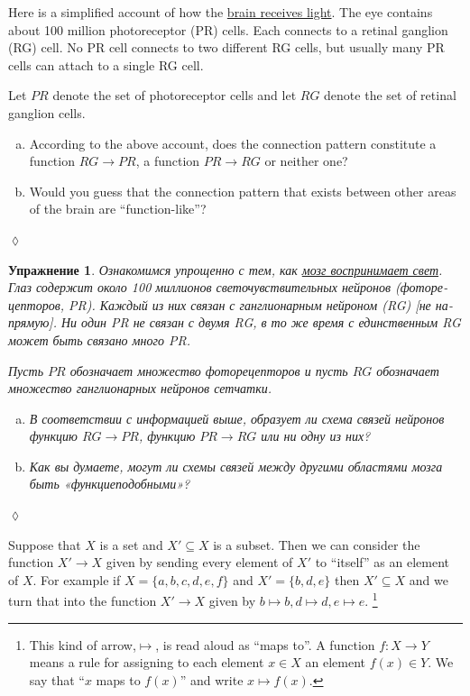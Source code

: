 \documentclass[a4paper]{book}
\def\to{\rightarrow}
\def\taking{\colon}
\def\ss{\subseteq}
\theoremstyle{myth}
\newtheorem{exampleENG}[envENG]{\begin{english}Example\end{english}}
\newtheorem{excENG}[envENG]{\begin{english}Exercise\end{english}}
\newenvironment{exerciseENG}{\begin{excENG}}{\hspace*{\fill}$\lozenge$\end{excENG}}
\newtheorem{excRUS}[envRUS]{Упражнение}
\newenvironment{exerciseRUS}{\begin{excRUS}}{\hspace*{\fill}$\lozenge$\end{excRUS}}
\def\sexc{\begin{enumerate}[a.)]\setlength{\itemsep}{.1cm}\setlength{\parskip}{.1cm}\item}
\def\next{\item}
\def\endsexc{\end{enumerate}}
\begin{document}
\begin{russian}
\begin{exerciseENG}
Here is a simplified account of how the \href{http://en.wikipedia.org/wiki/Retina}{\text brain receives light}. The eye contains about 100 million photoreceptor (PR) cells. Each connects to a retinal ganglion (RG) cell. No PR cell connects to two different RG cells, but usually many PR cells can attach to a single RG cell. 

Let $PR$ denote the set of photoreceptor cells and let $RG$ denote the set of retinal ganglion cells. 
\sexc According to the above account, does the connection pattern constitute a function $RG\to PR$, a function $PR\to RG$ or neither one? 
\next Would you guess that the connection pattern that exists between other areas of the brain are “function-like”?
\endsexc
\end{exerciseENG}

\begin{exerciseRUS}
Ознакомимся упрощенно с тем, как \href{https://ru.wikipedia.org/wiki/%D0%A1%D0%B5%D1%82%D1%87%D0%B0%D1%82%D0%BA%D0%B0}{\text мозг воспринимает свет}. Глаз содержит около 100 миллионов светочувствительных нейронов (фоторецепторов, PR). Каждый из них связан с ганглионарным нейроном (RG) [не напрямую]. Ни один PR не связан с двумя RG, в то же время с единственным RG может быть связано много PR.

Пусть $PR$ обозначает множество фоторецепторов и пусть $RG$ обозначает множество ганглионарных нейронов сетчатки. 
\sexc В соответствии с информацией выше, образует ли схема связей нейронов функцию $RG\to PR$, функцию $PR\to RG$ или ни одну из них? 
\next Как вы думаете, могут ли схемы связей между другими областями мозга быть «функциеподобными»? 
\endsexc 
\end{exerciseRUS}

\begin{exampleENG}\label{ex:subset as function}
Suppose that $X$ is a set and $X'\ss X$ is a subset. Then we can consider the function $X'\to X$ given by sending every element of $X'$ to “itself” as an element of $X$. For example if $X=\{a,b,c,d,e,f\}$ and $X'=\{b,d,e\}$ then $X'\ss X$ and we turn that into the function $X'\to X$ given by $b\mapsto b, d\mapsto d, e\mapsto e$.%
\footnote{This kind of arrow,\;\;$\mapsto$\;\;, is read aloud as “maps to”. A function $f\taking X\to Y$ means a rule for assigning to each element $x\in X$ an element $f(x)\in Y$. We say that “$x$ maps to $f(x)$” and write $x\mapsto f(x)$.}


\end{exampleENG}
\end{russian}
\end{document}
